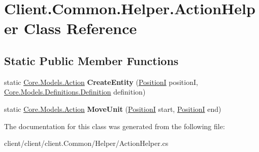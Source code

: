 \hypertarget{classClient_1_1Common_1_1Helper_1_1ActionHelper}{\section{Client.\-Common.\-Helper.\-Action\-Helper Class Reference}
\label{classClient_1_1Common_1_1Helper_1_1ActionHelper}
}
\subsection*{Static Public Member Functions}
\begin{DoxyCompactItemize}
\item 
\hypertarget{classClient_1_1Common_1_1Helper_1_1ActionHelper_a6ca9621c272406abb2496b33534abc06}{static \hyperlink{classCore_1_1Models_1_1Action}{Core.\-Models.\-Action} {\bfseries Create\-Entity} (\hyperlink{classCore_1_1Models_1_1PositionI}{Position\-I} position\-I, \hyperlink{classCore_1_1Models_1_1Definitions_1_1Definition}{Core.\-Models.\-Definitions.\-Definition} definition)}\label{classClient_1_1Common_1_1Helper_1_1ActionHelper_a6ca9621c272406abb2496b33534abc06}

\item 
\hypertarget{classClient_1_1Common_1_1Helper_1_1ActionHelper_a57696e59e0d3a58e65b720e79aeffb26}{static \hyperlink{classCore_1_1Models_1_1Action}{Core.\-Models.\-Action} {\bfseries Move\-Unit} (\hyperlink{classCore_1_1Models_1_1PositionI}{Position\-I} start, \hyperlink{classCore_1_1Models_1_1PositionI}{Position\-I} end)}\label{classClient_1_1Common_1_1Helper_1_1ActionHelper_a57696e59e0d3a58e65b720e79aeffb26}

\end{DoxyCompactItemize}


The documentation for this class was generated from the following file\-:\begin{DoxyCompactItemize}
\item 
client/client/client.\-Common/\-Helper/Action\-Helper.\-cs\end{DoxyCompactItemize}
